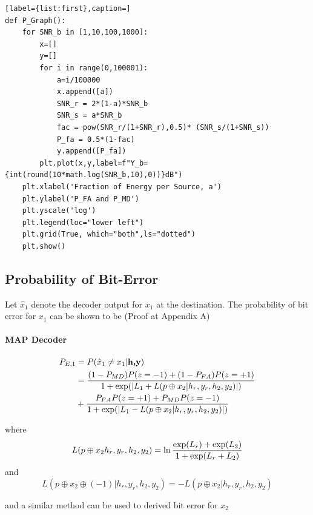 \documentclass[conference]{IEEEtran}
\begin{document}
\begin{lstlisting}[label={list:first},caption=]
def P_Graph():
    for SNR_b in [1,10,100,1000]:
        x=[]
        y=[]
        for i in range(0,100001):
            a=i/100000
            x.append([a])
            SNR_r = 2*(1-a)*SNR_b
            SNR_s = a*SNR_b
            fac = pow(SNR_r/(1+SNR_r),0.5)* (SNR_s/(1+SNR_s))
            P_fa = 0.5*(1-fac)
            y.append([P_fa])
        plt.plot(x,y,label=f"Y_b={int(round(10*math.log(SNR_b,10),0))}dB")
    plt.xlabel('Fraction of Energy per Source, a')
    plt.ylabel('P_FA and P_MD')
    plt.yscale('log')
    plt.legend(loc="lower left")
    plt.grid(True, which="both",ls="dotted")
    plt.show()
\end{lstlisting}





\subsection{Probability of Bit-Error}
Let $\hat x_1$ denote the decoder output for $x_1$ at the destination. The probability of bit error for $x_1$ can be shown to be \cite{b1} (Proof at Appendix A)
\paragraph{MAP Decoder}
\begin{equation}
\begin{split}
P_{E,1} & = P(\hat x_1\neq x_1 | \textbf{h,y})\\
 & = {(1-P_{MD})P(z=-1)+(1-P_{FA})P(z=+1)\over 1+\exp(| L_{1}+L(p\oplus x_{2}| h_{r},y_{r},h_{2},y_{2})|)}\\
 &+ {P_{FA}P(z=+1)+P_{MD}P(z=-1)\over 1+\exp(|L_{1}-L(p\oplus x_{2}| h_{r},y_{r},h_{2},y_{2})|)}
\end{split}
\end{equation}


where 
\[
L(p\oplus x_{2} h_{r}, y_{r}, h_{2}, y_{2}) = \ln{\exp(L_{r})+\exp(L_{2})\over 1+\exp(L_{r}+L_{2})}
\]
and
\begin{equation}
    L(p\oplus x_{2} \oplus (-1)|h_r,y_r,h_2,y_2) = -L(p\oplus x_{2}|h_r,y_r,h_2,y_2)
\end{equation}
 

and a similar method can be used to derived bit error for $x_2$
\end{document}
